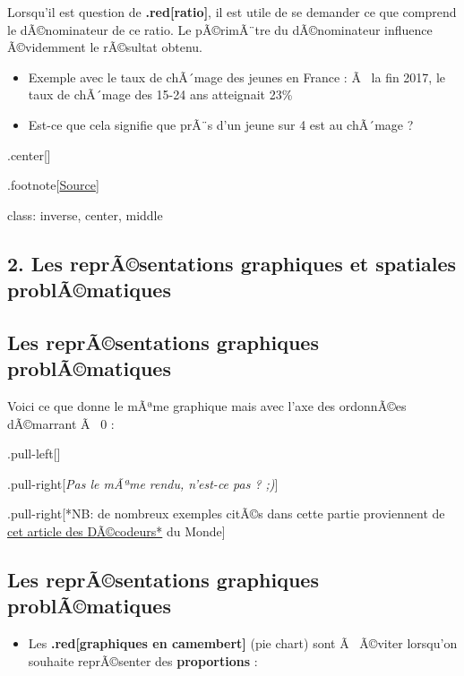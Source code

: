 \documentclass[]{article}
\providecommand{\tightlist}{%
  \setlength{\itemsep}{0pt}\setlength{\parskip}{0pt}}
\begin{document}
Lorsqu'il est question de \textbf{.red{[}ratio{]}}, il est utile de se
demander ce que comprend le dÃ©nominateur de ce ratio. Le pÃ©rimÃ¨tre du
dÃ©nominateur influence Ã©videmment le rÃ©sultat obtenu.

\begin{itemize}
\item
  Exemple avec le taux de chÃ´mage des jeunes en France : Ã~ la fin
  2017, le taux de chÃ´mage des 15-24 ans atteignait 23\%
\item
  Est-ce que cela signifie que prÃ¨s d'un jeune sur 4 est au chÃ´mage ?
\end{itemize}

.center{[}{]}

.footnote{[}\href{https://www.huffingtonpost.fr/2012/09/06/taux-chomage-bit-jeunes-dom_n_1860232.html}{Source}{]}

class: inverse, center, middle

\subsection{2. Les reprÃ©sentations graphiques et spatiales
problÃ©matiques}\label{les-reprasentations-graphiques-et-spatiales-problamatiques}

\subsection{Les reprÃ©sentations graphiques
problÃ©matiques}\label{les-reprasentations-graphiques-problamatiques}

Voici ce que donne le mÃªme graphique mais avec l'axe des ordonnÃ©es
dÃ©marrant Ã~ 0 :

.pull-left{[}{]}

.pull-right{[}\emph{Pas le mÃªme rendu, n'est-ce pas ? ;)}{]}

.pull-right{[}*NB: de nombreux exemples citÃ©s dans cette partie
proviennent de
\href{https://abonnes.lemonde.fr/les-decodeurs/article/2018/05/22/sept-conseils-pour-ne-pas-se-faire-avoir-par-les-representations-graphiques_5302680_4355770.html}{cet
article des DÃ©codeurs*} du Monde{]}

\subsection{Les reprÃ©sentations graphiques
problÃ©matiques}\label{les-reprasentations-graphiques-problamatiques-1}

\begin{itemize}
\tightlist
\item
  Les \textbf{.red{[}graphiques en camembert{]}} (pie chart) sont Ã~
  Ã©viter lorsqu'on souhaite reprÃ©senter des \textbf{proportions} :
\end{itemize}
\end{document}
